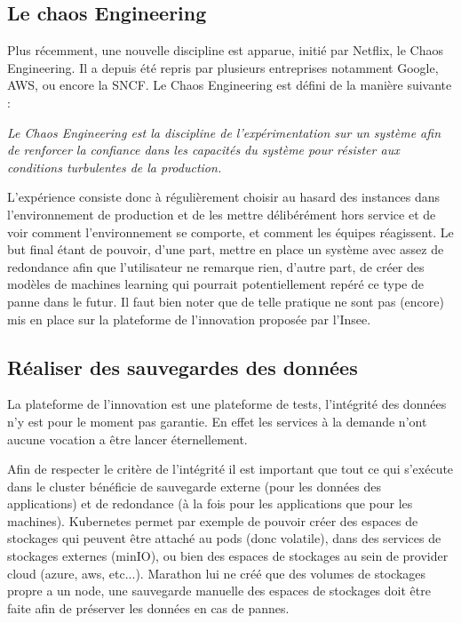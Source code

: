 \documentclass[11pt,fleqn]{book} %
\begin{document}
\subsection*{Le chaos Engineering}
Plus récemment, une nouvelle discipline est apparue, initié par Netflix, le Chaos Engineering. Il a depuis été repris par plusieurs entreprises notamment Google, AWS, ou encore la SNCF. Le Chaos Engineering est défini de la manière suivante : \newline

\textit{ Le Chaos Engineering est la discipline de l'expérimentation sur un système
afin de renforcer la confiance dans les capacités du système
pour résister aux conditions turbulentes de la production. }\newline

L’expérience consiste donc à régulièrement choisir au hasard des instances dans l’environnement de production et de les mettre délibérément hors service et de voir comment l'environnement se comporte, et comment les équipes réagissent. Le but final étant de pouvoir, d'une part, mettre en place un système avec assez de redondance afin que l'utilisateur ne remarque rien, d'autre part, de créer des modèles de machines learning qui pourrait potentiellement repéré ce type de panne dans le futur. Il faut bien noter que de telle pratique ne sont pas (encore) mis en place sur la plateforme de l'innovation proposée par l'Insee.


\subsection*{Réaliser des sauvegardes des données}
La plateforme de l'innovation est une plateforme de tests, l'intégrité des données n'y est pour le moment pas garantie. En effet les services à la demande n'ont aucune vocation a être lancer éternellement.\newline

Afin de respecter le critère de l'intégrité il est important que tout ce qui s'exécute dans le cluster bénéficie de sauvegarde externe (pour les données des applications) et de redondance (à la fois pour les applications que pour les machines). Kubernetes permet par exemple de pouvoir créer des espaces de stockages qui peuvent être attaché au pods (donc volatile), dans des services de stockages externes (minIO), ou bien des espaces de stockages au sein de provider cloud (azure, aws, etc...). Marathon lui ne créé que des volumes de stockages propre a un node, une sauvegarde manuelle des espaces de stockages doit être faite afin de préserver les données en cas de pannes. 
\end{document}
